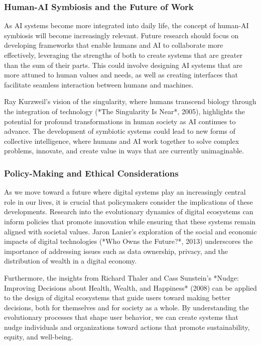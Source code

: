 \documentclass[12pt,twoside]{article}
\begin{document}
\subsubsection{ Human-AI Symbiosis and the Future of Work}

As AI systems become more integrated into daily life, the concept of human-AI symbiosis will become increasingly relevant. Future research should focus on developing frameworks that enable humans and AI to collaborate more effectively, leveraging the strengths of both to create systems that are greater than the sum of their parts. This could involve designing AI systems that are more attuned to human values and needs, as well as creating interfaces that facilitate seamless interaction between humans and machines.

Ray Kurzweil's vision of the singularity, where humans transcend biology through the integration of technology (*The Singularity Is Near*, 2005), highlights the potential for profound transformations in human society as AI continues to advance. The development of symbiotic systems could lead to new forms of collective intelligence, where humans and AI work together to solve complex problems, innovate, and create value in ways that are currently unimaginable.


\subsubsection{Policy-Making and Ethical Considerations}

As we move toward a future where digital systems play an increasingly central role in our lives, it is crucial that policymakers consider the implications of these developments. Research into the evolutionary dynamics of digital ecosystems can inform policies that promote innovation while ensuring that these systems remain aligned with societal values. Jaron Lanier's exploration of the social and economic impacts of digital technologies (*Who Owns the Future?*, 2013) underscores the importance of addressing issues such as data ownership, privacy, and the distribution of wealth in a digital economy.

Furthermore, the insights from Richard Thaler and Cass Sunstein's *Nudge: Improving Decisions about Health, Wealth, and Happiness* (2008) can be applied to the design of digital ecosystems that guide users toward making better decisions, both for themselves and for society as a whole. By understanding the evolutionary processes that shape user behavior, we can create systems that nudge individuals and organizations toward actions that promote sustainability, equity, and well-being.
\end{document}
